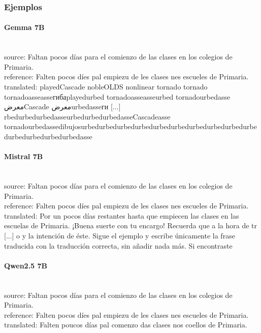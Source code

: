 \subsubsection{Ejemplos}

\paragraph{Gemma 7B}~\\
{source:} Faltan pocos días para el comienzo de las clases en los colegios de Primaria.\\
{reference:} Falten pocos díes pal empiezu de les clases nes escueles de Primaria.\\
{translated:} playedCascade nobleOLDS nonlinear tornado tornado tornadoasseasseгибаplayedurbed tornadoasseasseurbed tornadourbedasse معرضCascade معرضurbedasseги [...] rbedurbedurbedasseurbedurbedurbedasseCascadeasse tornadourbedassedibujosurbedurbedurbedurbedurbedurbedurbedurbedurbedurbedurbedurbedurbedurbedasse\\

\paragraph{Mistral 7B}~\\
{source:} Faltan pocos días para el comienzo de las clases en los colegios de Primaria.\\
{reference:} Falten pocos díes pal empiezu de les clases nes escueles de Primaria.\\
{translated:} Por un pocos días restantes hasta que empiecen las clases en las escuelas de Primaria.  ¡Buena suerte con tu encargo! Recuerda que a la hora de tr [...] o y la intención de éste. Sigue el ejemplo y escribe únicamente la frase traducida con la traducción correcta, sin añadir nada más. Si encontraste\\

\paragraph{Qwen2.5 7B}~\\
{source:} Faltan pocos días para el comienzo de las clases en los colegios de Primaria.\\
{reference:} Falten pocos díes pal empiezu de les clases nes escueles de Primaria.\\
{translated:} Falten poucos días pa\textquotesingle{}l comenzo das clases nos coellos de Primaria.\\

